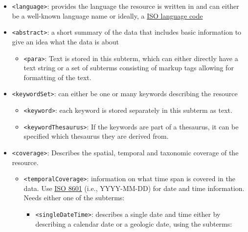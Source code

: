 \documentclass[
]{book}
\providecommand{\tightlist}{%
  \setlength{\itemsep}{0pt}\setlength{\parskip}{0pt}}
\begin{document}
\begin{itemize}
\item
  {\texttt{\textless{}language\textgreater{}}}: provides the language the resource is written in and can either be a well-known language name or ideally, a \href{https://www.w3schools.com/tags/ref_language_codes.asp}{ISO language code}
\item
  {\texttt{\textless{}abstract\textgreater{}}}: a short summary of the data that includes basic information to give an idea what the data is about

  \begin{itemize}
  \tightlist
  \item
    \texttt{\textless{}para\textgreater{}}: Text is stored in this subterm, which can either directly have a text string or a set of subterms consisting of markup tags allowing for formatting of the text.
  \end{itemize}
\item
  {\texttt{\textless{}keywordSet\textgreater{}}}: can either be one or many keywords describing the resource

  \begin{itemize}
  \tightlist
  \item
    \texttt{\textless{}keyword\textgreater{}}: each keyword is stored separately in this subterm as text.
  \item
    \texttt{\textless{}keywordThesaurus\textgreater{}}: If the keywords are part of a thesaurus, it can be specified which thesaurus they are derived from.
  \end{itemize}
\item
  {\texttt{\textless{}coverage\textgreater{}}}: Describes the spatial, temporal and taxonomic coverage of the resource.

  \begin{itemize}
  \tightlist
  \item
    {\texttt{\textless{}temporalCoverage\textgreater{}}}: information on what time span is covered in the data. Use \href{https://www.iso.org/iso-8601-date-and-time-format.html}{ISO 8601} (i.e., YYYY-MM-DD) for date and time information. Needs either one of the subterms:

    \begin{itemize}
    \tightlist
    \item
      \texttt{\textless{}singleDateTime\textgreater{}}: describes a single date and time either by describing a calendar date or a geologic date, using the subterms:


\end{itemize}
\end{itemize}
\end{itemize}
\end{document}
